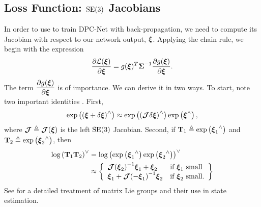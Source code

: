 \subsection{Loss Function: $\mathrm{SE}(3)$ Jacobians}
In order to use  to train DPC-Net with back-propagation, we need to compute its Jacobian with respect to our network output, $\boldsymbol{\mathbf{\xi}}$. Applying the chain rule, we begin with the expression
\begin{equation}
	\label{eq:se3_jacobchainrule}
	\dfrac{\partial \mathcal{L} (\boldsymbol{\mathbf{\xi}}) }{\partial  \boldsymbol{\mathbf{\xi}}} =  g({\boldsymbol{\mathbf{\xi}}})^T {\boldsymbol{\mathbf{\Sigma}}}^{-1} \dfrac{\partial g({\boldsymbol{\mathbf{\xi}}})}{\partial \boldsymbol{\mathbf{\xi}}}.
\end{equation}
The term $\dfrac{\partial g({\boldsymbol{\mathbf{\xi}}})}{\partial \boldsymbol{\mathbf{\xi}}}$ is of importance. We can derive it in two ways. To start, note two important identities \cite{Barfoot2017-ri}. First,
\begin{equation}
	\label{eq:delta_xi_exp}
\mathrm{exp}\left({( \boldsymbol{\mathbf{\xi}} + \delta \boldsymbol{\mathbf{\xi}})}^{\wedge}\right) \approx \mathrm{exp}\left({(\boldsymbol{\mathbf{\mathcal{J}}} \delta \boldsymbol{\mathbf{\xi}})}^{\wedge}\right) \mathrm{exp}\left({\boldsymbol{\mathbf{\xi}}}^{\wedge}\right),
\end{equation}
where $\boldsymbol{\mathbf{\mathcal{J}}} \triangleq \boldsymbol{\mathbf{\mathcal{J}}}(\boldsymbol{\mathbf{\xi}})$ is the left $\mathrm{SE}(3)$ Jacobian.
Second, if $\boldsymbol{\mathbf{T}}_1 \triangleq \mathrm{exp}\left({\boldsymbol{\mathbf{\xi}}_1}^{\wedge}\right)$ and $\boldsymbol{\mathbf{T}}_2 \triangleq \mathrm{exp}\left({\boldsymbol{\mathbf{\xi}}_2}^{\wedge}\right)$, then
\begin{align}
	\label{eq:jacobian_xi_small}
\mathrm{log}\left({\boldsymbol{\mathbf{T}}_1 \boldsymbol{\mathbf{T}}_2}\right)^{\vee} &= \mathrm{log}\left({ \mathrm{exp}\left({\boldsymbol{\mathbf{\xi}}_1}^{\wedge}\right) \mathrm{exp}\left({\boldsymbol{\mathbf{\xi}}_2}^{\wedge}\right) }\right)^{\vee} \nonumber \\
								  &\approx \left\{
	\begin{array}{ll}
		{  \boldsymbol{\mathbf{\mathcal{J}}}  (  \boldsymbol{\mathbf{\xi}}  _2)}^{-1} \boldsymbol{\mathbf{\xi}}_1 + \boldsymbol{\mathbf{\xi}}_2   & \mbox{if } \boldsymbol{\mathbf{\xi}}_1 ~ \mbox{small} \\
		\boldsymbol{\mathbf{\xi}}_1 + {\boldsymbol{\mathbf{\mathcal{J}}}(-\boldsymbol{\mathbf{\xi}}_1)}^{-1} \boldsymbol{\mathbf{\xi}}_2 & \mbox{if } \boldsymbol{\mathbf{\xi}}_2 ~ \mbox{small}.
	\end{array}
\right\}
\end{align}
See \cite{Barfoot2017-ri} for a detailed treatment of matrix Lie groups and their use in state estimation.
